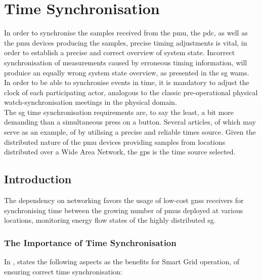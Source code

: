 

\section{Time Synchronisation}
In order to synchronise the samples received from the \acrshort{pmu}, the \acrshort{pdc}, as well as the \acrshort{pmu} devices producing the samples, precise timing adjustments is vital, in order to establish a precise and correct overview of system state. Incorrect synchronisation of measurements caused by erroneous timing information, will produice an equally wrong system state overview, as presented in the \acrshort{sg} \acrshort{wams}. \\ 


In order to be able to synchronise events in time, it is mandatory to adjust the clock of each participating actor, analogous to the classic pre-operational physical watch-synchronisation meetings in the physical domain. \\ 

The \acrshort{sg} time synchronisation requirements are, to say the least, a bit more demanding than a simultaneous press on a button. Several articles, of which \cite{appasani2018review} may serve as an example,  of by utilising a precise and reliable times source.  Given the distributed nature of the \acrshort{pmu} devices providing samples from locations distributed over a Wide Area Network, the \acrfull{gps} is the  time source selected. 

\subsection{Introduction}


The dependency on networking favors the usage of low-cost \acrshort{gnss} receivers for synchronising time between the growing number of \acrshort{pmu}s deployed at various locations, monitoring energy flow states of the highly distributed \acrshort{sg}. 



\subsubsection{The Importance of Time Synchronisation}

In \cite{dagle2019importance}, \citeauthor{dagle2019importance} states the following aspects as the benefits for Smart Grid operation, of ensuring correct time synchronisation:


